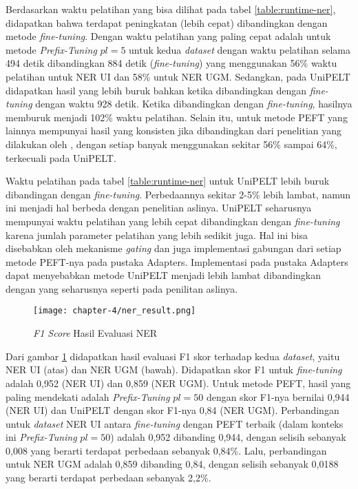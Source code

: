 Berdasarkan waktu pelatihan yang bisa dilihat pada tabel \ref{table:runtime-ner}, didapatkan bahwa terdapat peningkatan (lebih cepat) dibandingkan dengan metode \textit{fine-tuning}. Dengan waktu pelatihan yang paling cepat adalah untuk metode \textit{Prefix-Tuning} $pl=5$ untuk kedua \textit{dataset} dengan waktu pelatihan selama 494 detik dibandingkan 884 detik (\textit{fine-tuning}) yang menggunakan 56\% waktu pelatihan untuk NER UI dan 58\% untuk NER UGM. Sedangkan, pada UniPELT didapatkan hasil yang lebih buruk bahkan ketika dibandingkan dengan \textit{fine-tuning} dengan waktu 928 detik. Ketika dibandingkan dengan \textit{fine-tuning}, hasilnya memburuk menjadi 102\% waktu pelatihan. Selain itu, untuk metode PEFT yang lainnya mempunyai hasil yang konsisten jika dibandingkan dari penelitian yang dilakukan oleh \citeauthor{unipelt}, dengan setiap banyak menggunakan sekitar 56\% sampai 64\%, terkecuali pada UniPELT.

Waktu pelatihan pada tabel \ref{table:runtime-ner} untuk UniPELT lebih buruk dibandingan dengan \textit{fine-tuning}. Perbedaannya sekitar 2-5\% lebih lambat, namun ini menjadi hal berbeda dengan penelitian aslinya. UniPELT seharusnya mempunyai waktu pelatihan yang lebih cepat dibandingkan dengan \textit{fine-tuning} karena jumlah parameter pelatihan yang lebih sedikit juga. Hal ini bisa disebabkan oleh mekanisme \textit{gating} dan juga implementasi gabungan dari setiap metode PEFT-nya pada pustaka Adapters. Implementasi pada pustaka Adapters dapat menyebabkan metode UniPELT menjadi lebih lambat dibandingkan dengan yang seharusnya seperti pada penilitan aslinya.

\begin{figure}[h]
    \centering
    \centerline{\texttt{[image: chapter-4/ner\_result.png]}}
    \caption{\textit{F1 Score} Hasil Evaluasi NER}
    \label{fig:ner-result}
\end{figure}

Dari gambar \ref{fig:ner-result} didapatkan hasil evaluasi F1 skor terhadap kedua \textit{dataset}, yaitu NER UI (atas) dan NER UGM (bawah). Didapatkan skor F1 untuk \textit{fine-tuning} adalah 0,952 (NER UI) dan 0,859 (NER UGM). Untuk metode PEFT, hasil yang paling mendekati adalah \textit{Prefix-Tuning} $pl=50$ dengan skor F1-nya bernilai 0,944 (NER UI) dan UniPELT dengan skor F1-nya 0,84 (NER UGM). Perbandingan untuk \textit{dataset} NER UI antara \textit{fine-tuning} dengan PEFT terbaik (dalam konteks ini \textit{Prefix-Tuning} $pl=50$) adalah 0,952 dibanding 0,944, dengan selisih sebanyak 0,008 yang berarti terdapat perbedaan sebanyak 0,84\%. Lalu, perbandingan untuk NER UGM adalah 0,859 dibanding 0,84, dengan selisih sebanyak 0,0188 yang berarti terdapat perbedaan sebanyak 2,2\%. 


